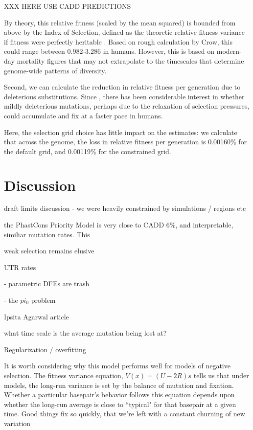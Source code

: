 \documentclass[11pt]{article}
\begin{document}
XXX HERE  USE CADD PREDICTIONS

By theory, this relative fitness (scaled by the mean squared) is
bounded from above by the Index of Selection, defined as the theoretic relative
fitness variance if fitness were perfectly heritable \parencite{Crow1958-pc}.
Based on rough calculation by Crow, this could range between 0.982-3.286 in
humans. However, this is based on modern-day mortality figures that may not
extrapolate to the timescales that determine genome-wide patterns of diversity. 

Second, we can calculate the reduction in relative fitness per generation due
to deleterious substitutions. Since \textcite{Muller1950-ta}, there has been
considerable interest in whether mildly deleterious mutations, perhaps due to
the relaxation of selection pressures, could accumulate and fix at a faster
pace in humans.

Here, the selection grid choice has little impact
on the estimates: we calculate that across the genome, the loss in relative
fitness per generation is 0.00160\% for the default grid, and 0.00119\% for the
constrained grid.


\section*{Discussion}

draft limits discussion - we were heavily constrained by simulations / regions
etc

the PhastCons Priority Model is very close to CADD 6\%, and interpretable,
similiar mutation rates. This 

weak selection remains elusive

UTR rates 

- parametric DFEs are trash

- the $pi_0$ problem

Ipsita Agarwal article 

what time scale is the average mutation being lost at?

Regularization / overfitting 

It is worth considering why this model performs well for models of negative
selection. The fitness variance equation, $V(x) = (U-2R)s$ tells us that under
models, the long-run variance is set by the balance of mutation and fixation.
Whether a particular basepair's behavior follows this equation depends upon
whether the long-run average is close to ``typical" for that basepair at a
given time. Good things fix so quickly, that we're left with a constant
churning of new variation
\end{document}
